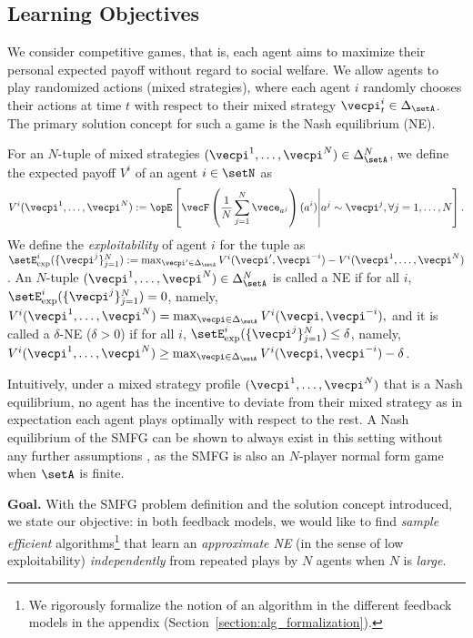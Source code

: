 \subsection{Learning Objectives}
We consider competitive games, that is, each agent aims to maximize their personal expected payoff without regard to social welfare.
We allow agents to play randomized actions (mixed strategies), where each agent $i$ randomly chooses their actions at time $t$ with respect to their mixed strategy $\vecpi_t^i \in \Delta_\setA$.
The primary solution concept for such a game is the Nash equilibrium (NE).

\begin{definition}\label{def:main_def_nplayer}
For an $N$-tuple of mixed strategies $(\vecpi^1, \ldots, \vecpi^N) \in \Delta_\setA^N$, we define the expected payoff $V^i$ of an agent $i \in \setN$ as
\begin{align*}
    V^i(\vecpi^1, \ldots, \vecpi^N) := \Exop \left[ \vecF\left( \frac{1}{N} \sum_{j=1}^N \vece_{a^j}\right)(a^i) \middle|
a^j \sim \vecpi^j, \forall j = 1, \ldots, N
\right].
\end{align*}
We define the \emph{exploitability} of agent $i$ for the tuple as $\setE^i_{\text{exp}}(\{\vecpi^j\}_{j=1}^N) := \max_{\vecpi'\in \Delta_\setA} V^i(\vecpi', \vecpi^{-i}) - V^i(\vecpi^1, \ldots, \vecpi^N)$. An $N$-tuple $(\vecpi^1, \ldots, \vecpi^N) \in \Delta_\setA^N$ is called a NE if for all $i$, $\setE^i_{\text{exp}}(\{\vecpi^j\}_{j=1}^N)=0$, namely, 
 $V^i(\vecpi^1, \ldots, \vecpi^N) = \max_{\vecpi\in \Delta_\setA} V^i(\vecpi, \vecpi^{-i}),$
and  it is called a $\delta$-NE ($\delta>0$) if 
for all $i$, $\setE^i_{\text{exp}}(\{\vecpi^j\}_{j=1}^N)\leq\delta$, namely, $V^i(\vecpi^1, \ldots, \vecpi^N) \geq \max_{\vecpi\in \Delta_\setA} V^i(\vecpi, \vecpi^{-i}) - \delta$.

\end{definition}

Intuitively, under a mixed strategy profile $(\vecpi^1, \ldots, \vecpi^N)$ that is a Nash equilibrium, no agent has the incentive to deviate from their mixed strategy as in expectation each agent plays optimally with respect to the rest.
A Nash equilibrium of the SMFG can be shown to always exist in this setting without any further assumptions \citep{nash1950non}, as the SMFG is also an $N$-player normal form game when $\setA$ is finite.

\textbf{Goal.}
With the SMFG problem definition and the solution concept introduced, we state our objective: in both feedback models, we would like to find \emph{sample efficient} algorithms\footnote{We rigorously formalize the notion of an algorithm in the different feedback models in the appendix (Section~\ref{section:alg_formalization}).} that learn an \emph{approximate NE} (in the sense of low exploitability) \emph{independently} from repeated plays by $N$ agents when $N$ is \emph{large}.


